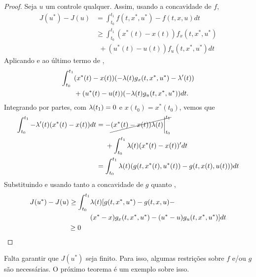 \begin{proof}
    Seja $u$ um controle qualquer. Assim, usando a concavidade de $f$,
    \begin{equation}
        \label{eq:first-result}
        \begin{split}
            J(u^*) - J(u) &= \int_{t_0}^{t_1} f(t, x^*, u^*) - f(t,x,u) dt \\
            &\ge \int_{t_0}^{t_1} (x^{*}(t) - x(t))f_x(t, x^*, u^*) \\ 
            &~~+ (u^*(t) - u(t))f_u(t, x^*, u^*)dt
        \end{split}
    \end{equation}
    Aplicando  e  ao último termo de
    , 
    \begin{equation*}
        \begin{split}
            \int_{t_0}^{t_1} &(x^{*}(t) - x(t))(-\lambda(t)g_x(t,x^*, u^*) - \lambda '(t)) \\ 
            &+ (u^*(t) - u(t))(-\lambda(t)g_u(t,x^*, u^*))dt.
        \end{split}
    \end{equation*}
    Integrando por partes, com $\lambda(t_1) = 0$ e $x(t_0) = x^*(t_0)$, vemos que
    \begin{equation*}
        \begin{split}
            \int_{t_0}^{t_1} -\lambda '(t)(x^*(t) - x(t))dt &= -\cancel{(x^*(t) - x(t))\lambda(t)\bigg\rvert_{t_0}^{t_1}} \\ 
            &~~~~+ \int_{t_0}^{t_1}\lambda(t)(x^*(t) - x(t))'dt \\
            &= \int_{t_0}^{t_1}\lambda(t)(g(t,x^*(t),u^*(t)) - g(t,x(t),u(t)))dt
        \end{split}
    \end{equation*}
    Substituindo e usando tanto a concavidade de $g$ quanto ,
    \begin{equation*}
        \begin{split}
            J(u^*) - J(u) \ge \int_{t_0}^{t_1} &\lambda(t)[g(t, x^*, u^*) - g(t,x,u) - \\
            &(x^* - x)g_x(t,x^*, u^*) - (u^* - u)g_u(t, x^*, u^*)]dt \\
            \ge 0 ~~~~&
        \end{split}
    \end{equation*}
\end{proof}

Falta garantir que $J(u^*)$ seja finito. Para isso, algumas restrições sobre
$f$ e/ou $g$ são necessárias. O próximo teorema é um exemplo sobre isso. 

